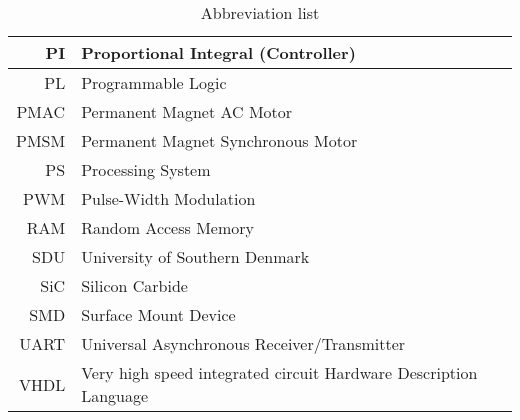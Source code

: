 \begin{table}[H]
\begin{tabular}{|r|l|}
PI           & Proportional Integral (Controller)                               \\ \hline
PL           & Programmable Logic                                               \\ \hline
PMAC         & Permanent Magnet AC Motor                                        \\ \hline
PMSM         & Permanent Magnet Synchronous Motor                               \\ \hline
PS           & Processing System                                                \\ \hline
PWM          & Pulse-Width Modulation                                           \\ \hline
RAM          & Random Access Memory                                             \\ \hline
SDU          & University of Southern Denmark                                   \\ \hline
SiC          & Silicon Carbide                                                  \\ \hline
SMD          & Surface Mount Device                                             \\ \hline
UART         & Universal Asynchronous Receiver/Transmitter                      \\ \hline
VHDL         & Very high speed integrated circuit Hardware Description Language \\ \hline

\end{tabular}
\caption{Abbreviation list}\label{Abbreviationlist}
\label{tab:variable_ids}
\end{table}
